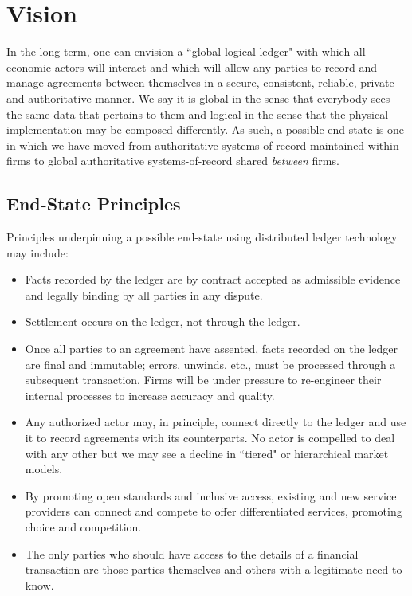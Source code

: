 \documentclass{article}
\begin{document}
\section{Vision}
In the long-term, one can envision a ``global logical ledger" with which all economic actors will interact and which will allow any parties to record and manage agreements between themselves in a secure, consistent, reliable, private and authoritative manner. We say it is global in the sense that everybody sees the same data that pertains to them and logical in the sense that the physical implementation may be composed differently. As such, a possible end-state is one in which we have moved from authoritative systems-of-record maintained within firms to global authoritative systems-of-record shared \textit{between} firms. 

\subsection{End-State Principles}
Principles underpinning a possible end-state using distributed ledger technology may include:
\begin{itemize}
	\item Facts recorded by the ledger are by contract accepted as admissible evidence and legally binding by all parties in any dispute.
	\item Settlement occurs on the ledger, not through the ledger.
	\item Once all parties to an agreement have assented, facts recorded on the ledger are final and immutable; errors, unwinds, etc., must be processed through a subsequent transaction. Firms will be under pressure to re-engineer their internal processes to increase accuracy and quality.
	\item Any authorized actor may, in principle, connect directly to the ledger and use it to record agreements with its counterparts. No actor is compelled to deal with any other but we may see a decline in ``tiered" or hierarchical market models. 
	\item By promoting open standards and inclusive access, existing and new service providers can connect and compete to offer differentiated services, promoting choice and competition.
	\item The only parties who should have access to the details of a financial transaction are those parties themselves and others with a legitimate need to know.
\end{itemize}
\end{document}
